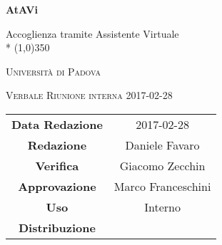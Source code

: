 \documentclass[a4paper,12pt]{article}
\begin{document}
\begin{titlepage}
	\centering
	{\huge\bfseries AtAVi\par}
	Accoglienza tramite Assistente Virtuale \\*
	\line(1,0){350} \\
	{\scshape\LARGE Università di Padova \par}
	\vspace{1cm}
	{\scshape\Large Verbale Riunione interna 2017-02-28\par}
	\vspace{1.5cm}
	\logo
	\vspace{2cm}	
	\vfill \vfill
	\begin{tabular}{c|c}
		{\hfill\textbf{Data Redazione}} 		& 2017-02-28	\\
		{\hfill\textbf{Redazione}} 			& Daniele Favaro		\\
		{\hfill\textbf{Verifica}} 				&  Giacomo Zecchin \\
		{\hfill\textbf{Approvazione}} 				&  Marco Franceschini \\
		{\hfill\textbf{Uso}} 				& Interno		\\
		{\hfill\textbf{Distribuzione}} 			& \kpanic\		\\
	\end{tabular}
\end{titlepage}

	\pagestyle{myfront}
	\newpage
	\tableofcontents
	
	\label{LastFrontPage}
	
	\newpage
	\pagestyle{mymain}
		
		
		
		
		
		
		
		
	
	\label{LastPage}
\end{document}
